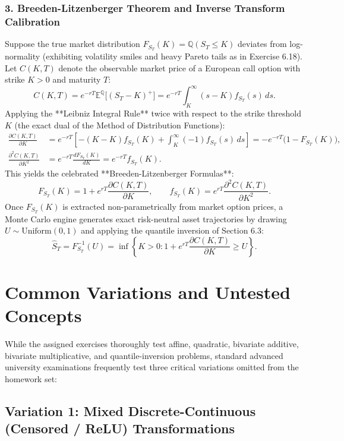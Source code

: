 \documentclass[11pt, letterpaper]{article}
\theoremstyle{definition}
\theoremstyle{remark}
\newcommand{\Q}{\mathbb{Q}}
\newcommand{\E}{\mathbb{E}}
\begin{document}
\subsubsection*{3. Breeden-Litzenberger Theorem and Inverse Transform Calibration}
Suppose the true market distribution $F_{S_T}(K) = \Q(S_T \le K)$ deviates from log-normality (exhibiting volatility smiles and heavy Pareto tails as in Exercise 6.18). Let $C(K, T)$ denote the observable market price of a European call option with strike $K > 0$ and maturity $T$:
\[
    C(K, T) = e^{-rT} \E^{\Q}\big[(S_T - K)^+\big] = e^{-rT} \int_{K}^{\infty} (s - K) f_{S_T}(s)\,ds.
\]
Applying the **Leibniz Integral Rule** twice with respect to the strike threshold $K$ (the exact dual of the Method of Distribution Functions):
\begin{align*}
    \frac{\partial C(K, T)}{\partial K} &= e^{-rT} \left[ -(K - K)f_{S_T}(K) + \int_{K}^{\infty} (-1) f_{S_T}(s)\,ds \right] = -e^{-rT}\big(1 - F_{S_T}(K)\big), \\
    \frac{\partial^2 C(K, T)}{\partial K^2} &= e^{-rT} \frac{dF_{S_T}(K)}{dK} = e^{-rT} f_{S_T}(K).
\end{align*}
This yields the celebrated **Breeden-Litzenberger Formulas**:
\[
    F_{S_T}(K) = 1 + e^{rT} \frac{\partial C(K, T)}{\partial K}, \qquad f_{S_T}(K) = e^{rT} \frac{\partial^2 C(K, T)}{\partial K^2}.
\]
Once $F_{S_T}(K)$ is extracted non-parametrically from market option prices, a Monte Carlo engine generates exact risk-neutral asset trajectories by drawing $U \sim \text{Uniform}(0, 1)$ and applying the quantile inversion of Section 6.3:
\[
    \widehat{S}_T = F_{S_T}^{-1}(U) = \inf\left\{ K > 0 : 1 + e^{rT}\frac{\partial C(K, T)}{\partial K} \ge U \right\}.
\]

\newpage
\section{Common Variations and Untested Concepts}

While the assigned exercises thoroughly test affine, quadratic, bivariate additive, bivariate multiplicative, and quantile-inversion problems, standard advanced university examinations frequently test three critical variations omitted from the homework set:

\subsection{Variation 1: Mixed Discrete-Continuous (Censored / ReLU) Transformations}
\end{document}
